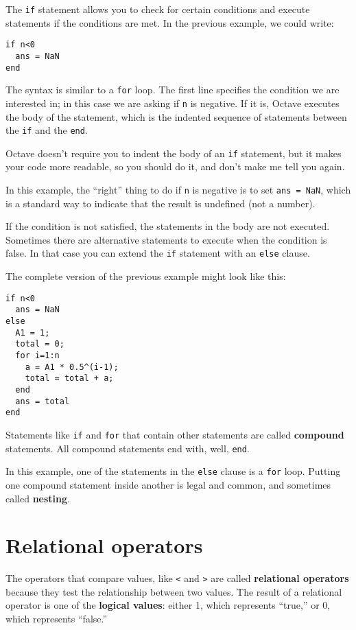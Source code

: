 The {\tt if} statement allows you to check for certain conditions
and execute statements if the conditions are met. In the previous
example, we could write:

\begin{verbatim}
if n<0
  ans = NaN
end
\end{verbatim}

The syntax is similar to a {\tt for} loop. The first line
specifies the condition we are interested in; in this case we
are asking if {\tt n} is negative. If it is, Octave executes
the body of the statement, which is the indented sequence of
statements between the {\tt if} and the {\tt end}.

Octave doesn't require you to indent the body of an {\tt if}
statement, but it makes your code more readable, so you should do it,
and don't make me tell you again.

In this example, the ``right'' thing to do if {\tt n} is negative
is to set {\tt ans = NaN}, which is a standard way to indicate that
the result is undefined (not a number).

If the condition is not satisfied, the statements in the body are
not executed. Sometimes there are alternative statements to
execute when the condition is false. In that case you can extend
the {\tt if} statement with an {\tt else} clause.

The complete version of the previous example might look like this:

\begin{verbatim}
if n<0
  ans = NaN
else
  A1 = 1;
  total = 0;
  for i=1:n
    a = A1 * 0.5^(i-1);
    total = total + a;
  end
  ans = total
end
\end{verbatim}

Statements like {\tt if} and {\tt for} that contain other statements
are called {\bf compound} statements. All compound statements end
with, well, {\tt end}.

In this example, one of the statements in the {\tt else} clause is a
{\tt for} loop. Putting one compound statement inside another is
legal and common, and sometimes called {\bf nesting}.


\section{Relational operators}

The operators that compare values, like {\tt <} and {\tt >} are
called {\bf relational operators} because they test the relationship
between two values. The result of a relational operator is one
of the {\bf logical values}:
either 1, which represents ``true,'' or 0, which represents ``false.''

